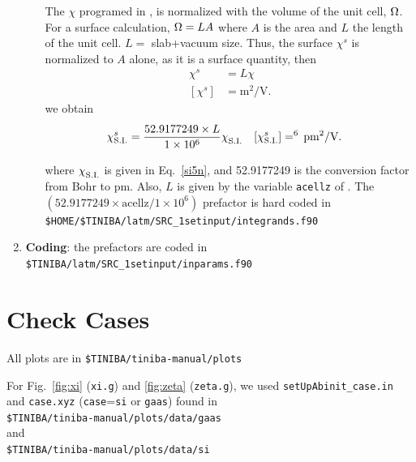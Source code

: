 \documentclass[12pt]{article}
\numberwithin{equation}{section}
\begin{document}
\begin{enumerate}
\begin{enumerate}
The $\chi$ programed in \tiniba, is normalized with the volume of the
unit cell, $\Omega$. For a surface calculation, $\Omega=LA$ where $A$ is the
area and $L$ the length of the unit cell. $L=$ slab+vacuum
size. Thus, the surface $\chi^s$ is normalized to $A$ alone, as it is
a surface quantity, then
\begin{align}\label{u.30}
\chi^s&=L\chi 
\\
[\chi^s]&=\text{m}^2/\text{V}
.
\end{align}
we obtain
\begin{align}\label{si14n}
\chi^s_{\mathrm{S.I.}}
&=\frac{52.9177249\times L}{1\times 10^6}
\chi^{\strut}_{\mathrm{S.I.}}
\quad[\chi^s_{\mathrm{S.I.}}]=\time 10^6\,\text{pm}^2/\text{V}. 
\end{align}
where $\chi^{\strut}_{\mathrm{S.I.}}$ is given in Eq.~\eqref{si5n}, and 
52.9177249
is the conversion factor from Bohr to pm. 
Also, $L$ is given by the variable 
\verb=acellz= of \tiniba. The 
$(52.9177249\times \text{acellz}/1\times 10^6)$ prefactor is hard coded in
\verb=$HOME/$TINIBA/latm/SRC_1setinput/integrands.f90=

\end{enumerate}


\item {\bf Coding}: the prefactors are coded in\\  
 \verb=$TINIBA/latm/SRC_1setinput/inparams.f90=

\end{enumerate}

\section{Check Cases}

All plots are in
\verb=$TINIBA/tiniba-manual/plots=

For Fig.~\ref{fig:xi} (\verb=xi.g=) and \ref{fig:zeta}
(\verb=zeta.g=), 
we used
\verb=setUpAbinit_case.in= and \verb=case.xyz= 
(\verb=case==\verb=si= or \verb=gaas=)
found in
\\
\verb=$TINIBA/tiniba-manual/plots/data/gaas=\\ 
and\\
\verb=$TINIBA/tiniba-manual/plots/data/si=\\
\end{document}
